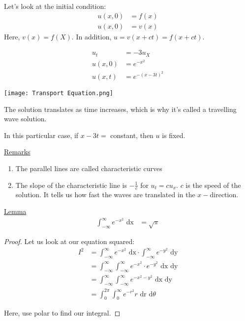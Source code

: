  Let's look at the initial condition:
  \begin{align}
    u(x, 0) & = f(x)\\
    u(x, 0) & = v(x)
  \end{align}
  Here, $v(x) = f(X)$. In addition, $u = v(x + ct) = f(x + ct)$.

  \ex%
  \begin{align}
    u_t & = -3u_X\\
    u(x, 0) & = e^{-x^2}\\
    u(x, t) & = e^{-(x - 3t)^2}
  \end{align}

\begin{center}
  \texttt{[image: Transport Equation.png]}
\end{center}

The solution translates as time increases, which is why it's called a travelling wave solution.

In this particular case, if $x - 3t = $ constant, then $u$ is fixed.

\underline{Remarks}
%
\begin{enumerate}
  \item The parallel lines are called characteristic curves
  \item The slope of the characteristic line is $-\frac{1}{c}$ for $u_t = cu_x$.
  $c$ is the speed of the solution.
  It tells us how fast the waves are translated in the $x-$direction.
\end{enumerate}

\underline{Lemma}
%
\begin{align}
  \int^\infty_{-\infty} e^{-x^2} \text{ dx} & = \sqrt \pi
\end{align}

\begin{proof}
  Let us look at our equation squared:
  \begin{align}
    I^2 & =
    \int^\infty_{-\infty} e^{-x^2} \text{ dx} \cdot
    \int^\infty_{-\infty} e^{-y^2} \text{ dy}\\
    & = \int^\infty_{-\infty} \int^\infty_{-\infty}
    e^{-x^2} \cdot e^{-y^2} \text{ dx dy}\\
    & =
    \int^\infty_{-\infty} \int^\infty_{-\infty}
    e^{-x^2 - y^2} \text{ dx dy}\\
    & =
    \int^{2 \pi}_{0} \int^\infty_0
    e^{-r^2} r \text{ dr d}\theta
  \end{align}

  Here, use polar to find our integral.
\end{proof}

